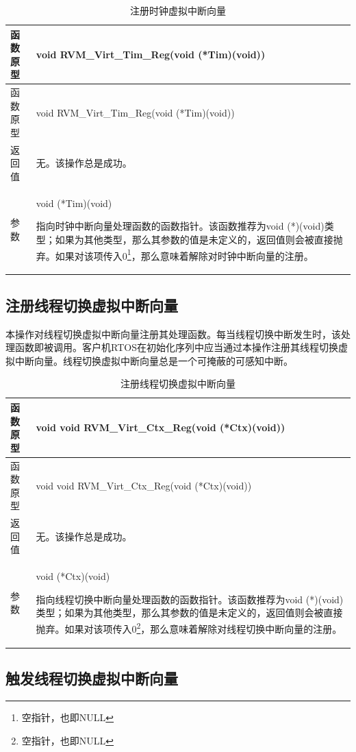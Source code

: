 \begin{xltabular}{\textwidth}{@{}>{\hsize\raggedright\arraybackslash}X>{\hsize\raggedright\arraybackslash}X@{}}
\caption{注册时钟虚拟中断向量}\label{tab:4-24}\\
\toprule
函数原型 & void RVM\_\allowbreak{}Virt\_\allowbreak{}Tim\_\allowbreak{}Reg(void (*Tim)(void))\tabularnewline
\endfirsthead
\toprule
函数原型 & void RVM\_\allowbreak{}Virt\_\allowbreak{}Tim\_\allowbreak{}Reg(void (*Tim)(void))\tabularnewline
\midrule
\endhead
\bottomrule
\endlastfoot
返回值 & 无。该操作总是成功。\tabularnewline
参数\strut
 & void (*Tim)(void)

指向时钟中断向量处理函数的函数指针。该函数推荐为void
(*)(void)类型；如果为其他类型，那么其参数的值是未定义的，返回值则会被直接抛弃。如果对该项传入0\footnote{空指针，也即NULL}，那么意味着解除对时钟中断向量的注册。\strut
\tabularnewline
\end{xltabular}

\subsection{注册线程切换虚拟中断向量}\label{subsec:4-5-7}

本操作对线程切换虚拟中断向量注册其处理函数。每当线程切换中断发生时，该处理函数即被调用。客户机RTOS在初始化序列中应当通过本操作注册其线程切换虚拟中断向量。线程切换虚拟中断向量总是一个可掩蔽的可感知中断。

\begin{xltabular}{\textwidth}{@{}>{\hsize\raggedright\arraybackslash}X>{\hsize\raggedright\arraybackslash}X@{}}
\caption{注册线程切换虚拟中断向量}\label{tab:4-25}\\
\toprule
函数原型 & void void RVM\_\allowbreak{}Virt\_\allowbreak{}Ctx\_\allowbreak{}Reg(void
(*Ctx)(void))\tabularnewline
\endfirsthead
\toprule
函数原型 & void void RVM\_\allowbreak{}Virt\_\allowbreak{}Ctx\_\allowbreak{}Reg(void
(*Ctx)(void))\tabularnewline
\midrule
\endhead
\bottomrule
\endlastfoot
返回值 & 无。该操作总是成功。\tabularnewline
参数\strut
 & void (*Ctx)(void)

指向线程切换中断向量处理函数的函数指针。该函数推荐为void
(*)(void)类型；如果为其他类型，那么其参数的值是未定义的，返回值则会被直接抛弃。如果对该项传入0\footnote{空指针，也即NULL}，那么意味着解除对线程切换中断向量的注册。\strut
\tabularnewline
\end{xltabular}

\subsection{触发线程切换虚拟中断向量}\label{subsec:4-5-8}

